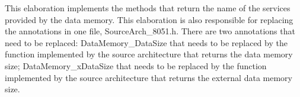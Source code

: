 This elaboration implements the methods that return the name of the services provided by the data memory. This elaboration is also responsible for replacing the annotations in one file, SourceArch\_8051.h. There are two annotations that need to be replaced: DataMemory\_DataSize that needs to be replaced by the function implemented by the source architecture that returns the data memory size; DataMemory\_xDataSize that needs to be replaced by the function implemented by the source architecture that returns the external data memory size.

